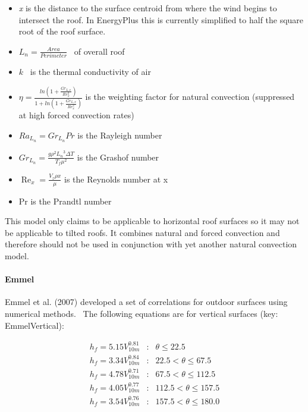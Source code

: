 \begin{itemize}
\item
  \emph{x} is the distance to the surface centroid from where the wind begins to intersect the roof. In EnergyPlus this is currently simplified to half the square root of the roof surface.
\item
  \({L_n} = \frac{{Area}}{{Perimeter}}\) ~of overall roof
\item
  \(k\) ~is the thermal conductivity of air
\item
  $\eta  = \frac{ln \left( 1 + \frac{Gr_{L,x}}{Re_x^2} \right)}{1 + ln \left( 1 + \frac{Gr_{L,x}}{Re_x^2} \right)}$ is the weighting factor for natural convection (suppressed at high forced convection rates)
\item
  $Ra_{L_n} = Gr_{L_n} Pr$ is the Rayleigh number
\item
  \(G{r_{{L_n}}} = \frac{{g{\rho ^2}{L_n}^3\Delta T}}{{{T_f}{\mu ^2}}}\) is the Grashof number
\item
  \({\operatorname{Re}_x} = \frac{{{V_z}\rho x}}{\mu }\) is the Reynolds number at x
\item
  Pr is the Prandtl number
\end{itemize}

This model only claims to be applicable to horizontal roof surfaces so it may not be applicable to tilted roofs. It combines natural and forced convection and therefore should not be used in conjunction with yet another natural convection model.

\paragraph{Emmel}\label{emmel}

Emmel et al. (2007) developed a set of correlations for outdoor surfaces using numerical methods.~ The following equations are for vertical surfaces (key: EmmelVertical):

\begin{equation}
\begin{array}{lcl}
    h_f = 5.15V^{0.81}_{10m} & : & \theta \leq 22.5 \\
    h_f = 3.34V^{0.84}_{10m} & : & 22.5 < \theta \leq 67.5 \\
    h_f = 4.78V^{0.71}_{10m} & : & 67.5 < \theta \leq 112.5 \\
    h_f = 4.05V^{0.77}_{10m} & : & 112.5 < \theta \leq 157.5 \\
    h_f = 3.54V^{0.76}_{10m} & : & 157.5 < \theta \leq 180.0
\end{array}
\end{equation}

